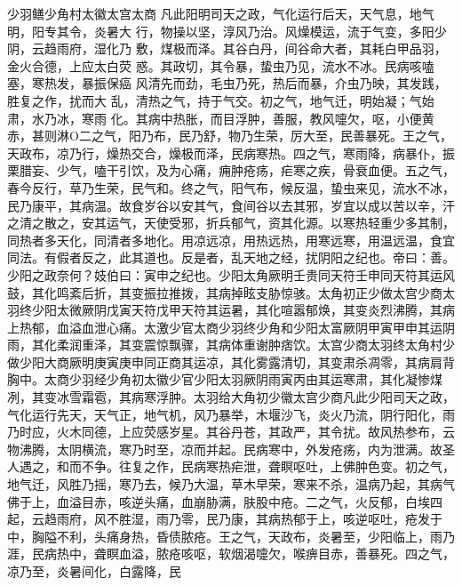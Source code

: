\documentclass[a4paper,12pt,UTF8,twoside]{ctexbook}
\begin{document}
少羽鳝少角村太徽太宫太商
凡此阳明司天之政，气化运行后天，天气息，地气明，阳专其令，炎暑大
行，物操以坚，淳风乃治。风燥模运，流于气变，多阳少阴，云趋雨府，湿化乃
敷，煤极而泽。其谷白丹，间谷命大者，其耗白甲品羽，金火合德，上应太白荧
惑。其政切，其令暴，蛰虫乃见，流水不冰。民病咳嗑塞，寒热发，暴振保癌
风清先而劲，毛虫乃死，热后而暴，介虫乃映，其发践，胜复之作，扰而大
乱，清热之气，持于气交。初之气，地气迁，明始凝；气始肃，水乃冰，寒雨
化。其病中热胀，而目浮肿，善服，教风嚏欠，呕，小便黄赤，甚则淋O二之气，阳乃布，民乃舒，物乃生荣，厉大至，民善暴死。王之气，天政布，凉乃行，燥热交合，燥极而泽，民病寒热。四之气，寒雨降，病暴仆，振栗腊妄、少气，嗑干引饮，及为心痛，痈肿疮疡，疟寒之疾，骨衰血便。五之气，春今反行，草乃生荣，民气和。终之气，阳气布，候反温，蛰虫来见，流水不冰，民乃康平，其病温。故食岁谷以安其气，食间谷以去其邪，岁宜以成以苦以辛，汗之清之散之，安其运气，天使受邪，折兵郁气，资其化源。以寒热轻重少多其制，同热者多天化，同清者多地化。用凉远凉，用热远热，用寒远寒，用温远温，食宜同法。有假者反之，此其道也。反是者，乱天地之经，扰阴阳之纪也。帝曰：善。少阳之政奈何？妓伯曰：寅申之纪也。少阳太角厥明壬贵同天符壬申同天符其运风鼓，其化鸣紊后折，其变振拉推拨，其病掉眩支胁惊骇。太角初正少做太宫少商太羽终少阳太微厥阴戊寅天符戊甲天符其运暑，其化喧嚣郁焕，其变炎烈沸腾，其病上热郁，血溢血泄心痛。太激少官太商少羽终少角和少阳太富厥阴甲寅甲申其运阴雨，其化柔润重泽，其变震惊飘骤，其病体重谢肿痞饮。太宫少商太羽终太角村少做少阳大商厥明庚寅庚申同正商其运凉，其化雾露清切，其变肃杀凋零，其病肩背胸中。太商少羽经少角初太徽少官少阳太羽厥阴雨寅丙由其运寒肃，其化凝惨煤冽，其变冰雪霜雹，其病寒浮肿。太羽给大角初少徽太宫少商凡此少阳司天之政，气化运行先天，天气正，地气机，风乃暴举，木堰沙飞，炎火乃流，阴行阳化，雨乃时应，火木同德，上应荧感岁星。其谷丹苍，其政严，其令扰。故风热参布，云物沸腾，太阴横流，寒乃时至，凉而并起。民病寒中，外发疮疡，内为泄满。故圣人遇之，和而不争。往复之作，民病寒热疟泄，聋瞑呕吐，上佛肿色变。初之气，地气迁，风胜乃摇，寒乃去，候乃大温，草木早荣，寒来不杀，温病乃起，其病气佛于上，血溢目赤，咳逆头痛，血崩胁满，肤股中疮。二之气，火反郁，白埃四起，云趋雨府，风不胜湿，雨乃零，民乃康，其病热郁于上，咳逆呕吐，疮发于中，胸隘不利，头痛身热，昏债脓疮。王之气，天政布，炎暑至，少阳临上，雨乃涯，民病热中，聋瞑血溢，脓疮咳呕，软烟渴嚏欠，喉痹目赤，善暴死。四之气，凉乃至，炎暑间化，白露降，民
\end{document}
